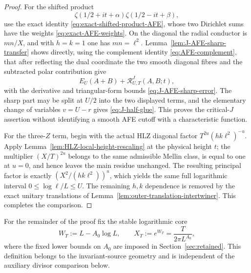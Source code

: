 \begin{proof}
For the shifted product
\[
\zeta(1/2+it+\alpha)\zeta(1/2-it+\beta),
\]
use the exact identity \eqref{eq:exact-shifted-product-AFE}, whose two
Dirichlet sums have the weights \eqref{eq:exact-AFE-weights}.  On the diagonal
the radial conductor is
$mn/X$, and with $h=k=1$ one has $mn=\ell^2$.  Lemma~\ref{lem:J-AFE-sharp-transfer}
shows directly, using the complement identity \eqref{eq:AFE-complement}, that
after reflecting the dual coordinate the two smooth diagonal fibres and the
subtracted polar contribution give
\[
E_U(A+B)+\mathcal R^J_{U,T}(A,B;t),
\]
with the derivative and triangular-form bounds
\eqref{eq:J-AFE-sharp-error}.  The sharp part may be split at $U/2$ into the two
displayed terms, and the elementary change of variables $v=U-r$ gives
\eqref{eq:J-half-glue}.  This proves the critical-$J$ assertion without
identifying a smooth AFE cutoff with a characteristic function.

For the three-$Z$ term, begin with the actual HLZ diagonal factor
$T^{2u}(hk\ell^2)^{-u}$.  Apply
Lemma~\ref{lem:HLZ-local-height-rescaling} at the physical height $t$; the
multiplier $(X/T)^{2u}$ belongs to the same admissible Mellin class, is equal to
one at $u=0$, and hence leaves the main residue unchanged.  The resulting
principal factor is exactly $(X^2/(hk\ell^2))^u$, which yields the same full
logarithmic interval $0\le\log\ell/L\le U$.  The remaining $h,k$ dependence is
removed by the exact unitary translations of
Lemma~\ref{lem:outer-translation-intertwiner}.  This completes the comparison.
\end{proof}

For the remainder of the proof fix the stable logarithmic core
\begin{equation}
\boxed{
W_T:=L-A_0\log L,
\qquad
X_T:=e^{W_T}=\frac{T}{2\pi L^{A_0}},
}
\label{eq:stable-log-core}
\end{equation}
where the fixed lower bounds on $A_0$ are imposed in
Section~\ref{sec:retained}. This definition belongs to the invariant-source
geometry and is independent of the auxiliary divisor comparison below.

